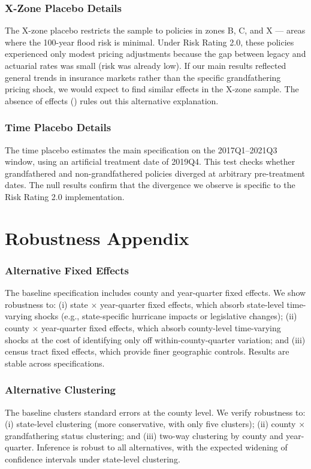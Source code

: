 \documentclass[12pt]{article}
\begin{document}
\subsubsection*{X-Zone Placebo Details} The X-zone placebo restricts the sample to policies in zones B, C, and X --- areas where the 100-year flood risk is minimal. Under Risk Rating 2.0, these policies experienced only modest pricing adjustments because the gap between legacy and actuarial rates was small (risk was already low). If our main results reflected general trends in insurance markets rather than the specific grandfathering pricing shock, we would expect to find similar effects in the X-zone sample. The absence of effects () rules out this alternative explanation.

\subsubsection*{Time Placebo Details} The time placebo estimates the main specification on the 2017Q1--2021Q3 window, using an artificial treatment date of 2019Q4. This test checks whether grandfathered and non-grandfathered policies diverged at arbitrary pre-treatment dates. The null results confirm that the divergence we observe is specific to the Risk Rating 2.0 implementation.


\section{Robustness Appendix}
\label{app:robustness}

\subsubsection*{Alternative Fixed Effects} The baseline specification includes county and year-quarter fixed effects. We show robustness to: (i) state $\times$ year-quarter fixed effects, which absorb state-level time-varying shocks (e.g., state-specific hurricane impacts or legislative changes); (ii) county $\times$ year-quarter fixed effects, which absorb county-level time-varying shocks at the cost of identifying only off within-county-quarter variation; and (iii) census tract fixed effects, which provide finer geographic controls. Results are stable across specifications.

\subsubsection*{Alternative Clustering} The baseline clusters standard errors at the county level. We verify robustness to: (i) state-level clustering (more conservative, with only five clusters); (ii) county $\times$ grandfathering status clustering; and (iii) two-way clustering by county and year-quarter. Inference is robust to all alternatives, with the expected widening of confidence intervals under state-level clustering.
\end{document}
